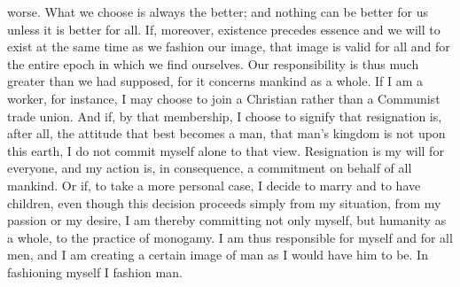 \documentclass[12pt]{article}
\begin{document}
worse. What we choose is always the better; and nothing can be better for us unless it is better for all. If, moreover, existence precedes essence and we will to exist at the same time as we fashion our image, that image is valid for all and for the entire epoch in which we find ourselves. Our responsibility is thus much greater than we had supposed, for it concerns mankind as a whole. If I am a worker, for instance, I may choose to join a Christian rather than a Communist trade union. And if, by that membership, I choose to signify that resignation is, after all, the attitude that best becomes a man, that man’s kingdom is not upon this earth, I do not commit myself alone to that view. Resignation is my will for everyone, and my action is, in consequence, a commitment on behalf of all mankind. Or if, to take a more personal case, I decide to marry and to have children, even though this decision proceeds simply from my situation, from my passion or my desire, I am thereby committing not only myself, but humanity as a whole, to the practice of monogamy. I am thus responsible for myself and for all men, and I am creating a certain image of man as I would have him to be. In fashioning myself I fashion man.
\end{document}
